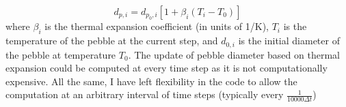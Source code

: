 \begin{equation}
	d_{p,i} = d_{p_0,i}\left[1+\beta_i\left(T_i - T_0\right)\right]
\end{equation}
where $\beta_i$ is the thermal expansion coefficient (in units of \si{1/K}), $T_i$ is the temperature of the pebble at the current step, and $d_{0,i}$ is the initial diameter of the pebble at temperature $T_0$. The update of pebble diameter based on thermal expansion could be computed at every time step as it is not computationally expensive. All the same, I have left flexibility in the code to allow the computation at an arbitrary interval of time steps (typically every $\frac{1}{10000\Delta t}$)

